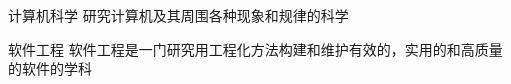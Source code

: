 \documentclass{ctexart}
\begin{document}
\begin{compactdesc}
    \item [计算机科学]研究计算机及其周围各种现象和规律的科学
    \item [{\kaishu 软件工程}]软件工程是一门研究用工程化方法构建和维护有效的，实用的和高质量的软件的学科
\end{compactdesc}
\end{document}
